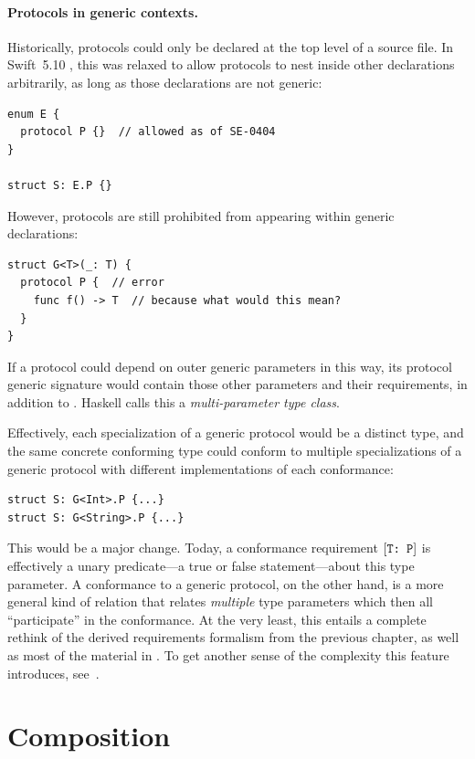 \documentclass[../generics]{subfiles}
\begin{document}
\paragraph{Protocols in generic contexts.}
Historically, protocols could only be declared at the top level of a source file. In Swift~5.10 \cite{se0404}, this was relaxed to allow protocols to nest inside other declarations arbitrarily, as long as those declarations are not generic:
\begin{Verbatim}
enum E {
  protocol P {}  // allowed as of SE-0404
}

struct S: E.P {}
\end{Verbatim}
However, protocols are still prohibited from appearing within generic declarations:
\begin{Verbatim}
struct G<T>(_: T) {
  protocol P {  // error
    func f() -> T  // because what would this mean?
  }
}
\end{Verbatim}
If a protocol could depend on outer generic parameters in this way, its protocol generic signature would contain those other parameters and their requirements, in addition to \IndexSelf\tSelf. Haskell calls this a \emph{multi-parameter type class}.

Effectively, each specialization of a generic protocol would be a distinct type, and the same concrete conforming type could conform to multiple specializations of a generic protocol with different implementations of each conformance:
\begin{Verbatim}
struct S: G<Int>.P {...}
struct S: G<String>.P {...}
\end{Verbatim}
This would be a major change. Today, a conformance requirement $[\texttt{T:~P}]$ is effectively a unary predicate---a true or false statement---about this type parameter. A conformance to a generic protocol, on the other hand, is a more general kind of relation that relates \emph{multiple} type parameters which then all ``participate'' in the conformance. At the very least, this entails a complete rethink of the derived requirements formalism from the previous chapter, as well as most of the material in . To get another sense of the complexity this feature introduces, see~\cite{mptc}.

\section{Composition}\label{sec:composition}
\end{document}
